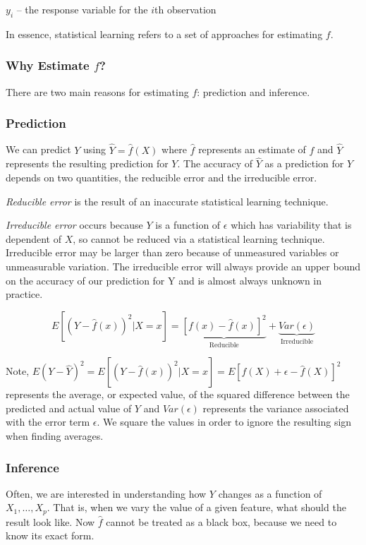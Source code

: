 \documentclass{article}
\numberwithin{equation}{section}
\begin{document}
$y_i$ -- the response variable for the $i$th observation

In essence, statistical learning refers to a set of approaches for estimating $f$. 

\subsubsection{Why Estimate \texorpdfstring{$f$}{f}?}
There are two main reasons for estimating $f$: prediction and inference. 

\subsubsection*{Prediction}

We can predict $Y$ using $\hat Y = \hat f(X)$ where $\hat f$ represents an estimate of $f$ and $\hat Y$ represents the resulting prediction for $Y$. The accuracy of $\hat Y$ as a prediction for $Y$ depends on two quantities, the reducible error and the irreducible error. 

\textit{Reducible error} is the result of an inaccurate statistical learning technique.

\textit{Irreducible error} occurs because $Y$ is a function of $\epsilon$ which has variability that is dependent of $X$, so cannot be reduced via a statistical learning technique. Irreducible error may be larger than zero because of unmeasured variables or unmeasurable variation. The irreducible error will always provide an upper bound on the accuracy of our prediction for Y and is almost always unknown in practice.

\begin{equation}
    E[(Y - \hat f (x))^2 | X = x] = \underbrace{[f(x) - \hat f(x)]^2}_{\text{Reducible}} + \underbrace{Var(\epsilon)}_{\text{Irreducible}} 
\end{equation}

Note, $E(Y - \hat Y)^2 = E[(Y - \hat f (x))^2 | X = x] = E[f(X) + \epsilon - \hat f(X)]^2$ represents the average, or expected value, of the squared difference between the predicted and actual value of $Y$ and $Var(\epsilon)$ represents the variance associated with the error term  $\epsilon$. We square the values in order to ignore the resulting sign when finding averages.


\subsubsection*{Inference}
Often, we are interested in understanding how $Y$ changes as a function of $X_1,\dots,X_p$. That is, when we vary the value of a given feature, what should the result look like. Now $\hat f$ cannot be treated as a black box, because we need to know its exact form.
\end{document}
